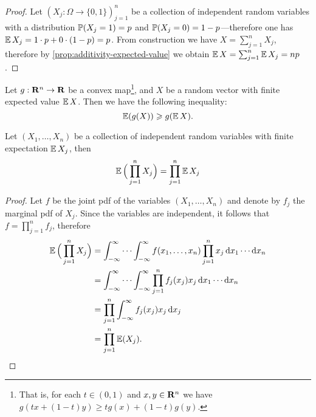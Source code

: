 \begin{proof}
    Let \((X_j: \Omega \to \{0, 1\})_{j=1}^n\) be a collection of independent random
    variables with a distribution \(\operatorname{\mathbb{P}}(X_j = 1) = p\) and
    \(\operatorname{\mathbb{P}}(X_j = 0) = 1 - p\)---therefore one has
    \(\operatorname{\mathbb{E}} X_j = 1 \cdot p + 0 \cdot (1 - p) = p\). From construction we have
    \(X = \sum_{j=1}^n X_j\), therefore by \cref{prop:additivity-expected-value} we obtain
    \(\operatorname{\mathbb{E}} X = \sum_{j=1}^n \operatorname{\mathbb{E}} X_j = n p\).
\end{proof}

\begin{theorem}
    \label{thm:jensen-inequality-expected-value}
    Let \(g: \mathbf{R}^n \to \mathbf{R}\) be a convex map\footnote{That is, for each \(t \in (0, 1)\) and
        \(x, y \in \mathbf{R}^n\) we have \(g(t x + (1 - t) y) \geq t g(x) + (1 - t) g(y)\).}, and
    \(X\) be a random vector
    with finite expected value
    \(\operatorname{\mathbb{E}} X\). Then we have the following inequality:
    \[
        \operatorname{\mathbb{E}}(g(X)) \geqslant g(\operatorname{\mathbb{E}} X ).
    \]
\end{theorem}

\begin{proposition}
    \label{prop:expected-value-distributes-under-multiplication}
    Let \((X_1, \dots, X_n)\) be a collection of independent random variables with
    finite expectation \(\operatorname{\mathbb{E}} X_j\), then
    \[
        \operatorname{\mathbb{E}}\Big( \prod_{j=1}^n X_j \Big) = \prod_{j=1}^n \operatorname{\mathbb{E}} X_j
    \]
\end{proposition}

\begin{proof}
    Let \(f\) be the joint pdf of the variables \((X_1, \dots, X_n)\) and denote by
    \(f_j\) the marginal pdf of \(X_j\). Since the variables are independent, it
    follows that \(f = \prod_{j=1}^n f_j\), therefore
    \begin{align*}
        \operatorname{\mathbb{E}}\Big( \prod_{j=1}^n X_j \Big)
         & = \int_{-\infty}^{\infty} \cdots \int_{-\infty}^{\infty}
        f(x_1, \dots, x_n) \prod_{j=1}^n x_j\, \mathrm{d} x_1 \cdots \mathrm{d} x_n   \\
         & = \int_{-\infty}^{\infty} \cdots \int_{-\infty}^{\infty}
        \prod_{j=1}^n f_j(x_j) x_j\, \mathrm{d} x_1 \cdots \mathrm{d} x_n             \\
         & = \prod_{j=1}^n \int_{-\infty}^{\infty} f_j(x_j) x_j\, \mathrm{d} x_j \\
         & = \prod_{j=1}^n \operatorname{\mathbb{E}}(X_j).
    \end{align*}
\end{proof}

